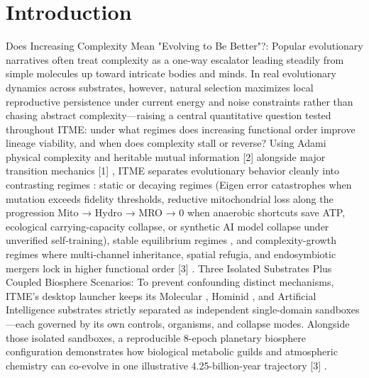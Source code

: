 \documentclass[10pt,letterpaper]{article}
\begin{document}
\section{Introduction}
Does Increasing Complexity Mean "Evolving to Be Better"?: Popular evolutionary narratives often treat complexity as a one-way escalator leading steadily from simple molecules up toward intricate bodies and minds. In real evolutionary dynamics across substrates, however, natural selection maximizes local reproductive persistence under current energy and noise constraints rather than chasing abstract complexity---raising a central quantitative question tested throughout ITME: under what regimes does increasing functional order improve lineage viability, and when does complexity stall or reverse? Using Adami physical complexity and heritable mutual information [2] alongside major transition mechanics [1] , ITME separates evolutionary behavior cleanly into contrasting regimes : static or decaying regimes (Eigen error catastrophes when mutation exceeds fidelity thresholds, reductive mitochondrial loss along the progression Mito → Hydro → MRO → 0 when anaerobic shortcuts save ATP, ecological carrying-capacity collapse, or synthetic AI model collapse under unverified self-training), stable equilibrium regimes , and complexity-growth regimes where multi-channel inheritance, spatial refugia, and endosymbiotic mergers lock in higher functional order [3] . Three Isolated Substrates Plus Coupled Biosphere Scenarios: To prevent confounding distinct mechanisms, ITME's desktop launcher keeps its Molecular , Hominid , and Artificial Intelligence substrates strictly separated as independent single-domain sandboxes---each governed by its own controls, organisms, and collapse modes. Alongside those isolated sandboxes, a reproducible 8-epoch planetary biosphere configuration demonstrates how biological metabolic guilds and atmospheric chemistry can co-evolve in one illustrative 4.25-billion-year trajectory [3] .
\end{document}
